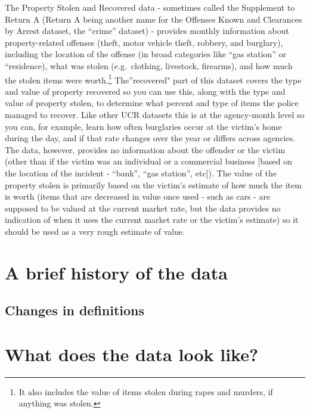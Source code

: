 \documentclass[
  12pt,
  openany]{book}
\begin{document}
The Property Stolen and Recovered data - sometimes called the Supplement to Return A (Return A being another name for the Offenses Known and Clearances by Arrest dataset, the ``crime'' dataset) - provides monthly information about property-related offenses (theft, motor vehicle theft, robbery, and burglary), including the location of the offense (in broad categories like ``gas station'' or ``residence), what was stolen (e.g.~clothing, livestock, firearms), and how much the stolen items were worth.\footnote{It also includes the value of items stolen during rapes and murders, if anything was stolen.} The''recovered" part of this dataset covers the type and value of property recovered so you can use this, along with the type and value of property stolen, to determine what percent and type of items the police managed to recover. Like other UCR datasets this is at the agency-month level so you can, for example, learn how often burglaries occur at the victim's home during the day, and if that rate changes over the year or differs across agencies. The data, however, provides no information about the offender or the victim (other than if the victim was an individual or a commercial business {[}based on the location of the incident - ``bank'', ``gas station'', etc{]}). The value of the property stolen is primarily based on the victim's estimate of how much the item is worth (items that are decreased in value once used - such as cars - are supposed to be valued at the current market rate, but the data provides no indication of when it uses the current market rate or the victim's estimate) so it should be used as a very rough estimate of value.

\hypertarget{a-brief-history-of-the-data-5}{%
\section{A brief history of the data}\label{a-brief-history-of-the-data-5}}

\hypertarget{changes-in-definitions-5}{%
\subsection{Changes in definitions}\label{changes-in-definitions-5}}

\hypertarget{what-does-the-data-look-like-5}{%
\section{What does the data look like?}\label{what-does-the-data-look-like-5}}
\end{document}
